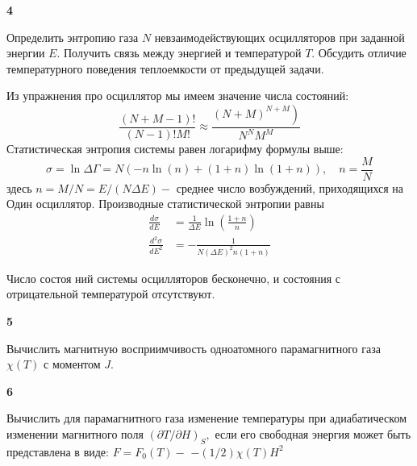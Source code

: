 \documentclass[a4paper,12pt]{article} %
\begin{document}
\begin{ttask}\textbf{4}

Определить энтропию газа $ N $ невзаимодействующих осцилляторов при заданной энергии $ E$. 
Получить связь между энергией и температурой $ T$.
Обсудить отличие температурного поведения теплоемкости от предыдущей задачи.

Из упражнения про осциллятор мы имеем значение числа состояний:
$$
\frac{(N+M-1) !}{(N-1) ! M !} \approx \frac{\left.(N+M)^{N+M}\right)}{N^{N} M^{M}}
$$
Статистическая энтропия системы равен логарифму формулы выше:
$$
\sigma=\ln \Delta \Gamma=N(-n \ln (n)+(1+n) \ln (1+n)), \quad n=\frac{M}{N}
$$
здесь $n=M / N=E /(N \Delta E)-$ среднее число возбуждений, приходящихся на Один осциллятор.
Производные статистической энтропии равны
$$
\begin{aligned}
\frac{d \sigma}{d E} &=\frac{1}{\Delta E} \ln \left(\frac{1+n}{n}\right) \\
\frac{d^{2} \sigma}{d E^{2}} &=-\frac{1}{N(\Delta E)^{2} n(1+n)}
\end{aligned}
$$

Число состоя ний системы осцилляторов бесконечно, и состояния с отрицательной температурой отсутствуют.





\end{ttask}


\begin{ttask} \textbf{5}

Вычислить магнитную восприимчивость одноатомного парамагнитного газа $ \chi(T) $ с моментом $ J $.







\end{ttask}


\begin{ttask}\textbf{6}

Вычислить для парамагнитного газа изменение температуры при адиабатическом изменении магнитного поля $(\partial T / \partial H)_{S},$ 
если его свободная энергия может быть представлена в виде: $F=F_{0}(T)-$ $-(1 / 2) \chi(T) H^{2}$




\end{ttask}
\end{document}
